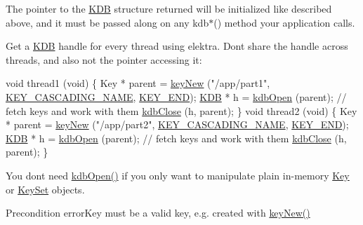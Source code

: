 The pointer to the {\ttfamily \hyperlink{classkdb_1_1KDB}{K\+DB}} structure returned will be initialized like described above, and it must be passed along on any kdb$\ast$() method your application calls.

Get a {\ttfamily \hyperlink{classkdb_1_1KDB}{K\+DB}} handle for every thread using elektra. Don\textquotesingle{}t share the handle across threads, and also not the pointer accessing it\+:


\begin{DoxyCodeInclude}
\textcolor{keywordtype}{void} thread1 (\textcolor{keywordtype}{void})
\{
        Key * parent = \hyperlink{group__key_gad23c65b44bf48d773759e1f9a4d43b89}{keyNew} (\textcolor{stringliteral}{"/app/part1"}, \hyperlink{group__key_gga91fb3178848bd682000958089abbaf40afc1567f74444ff9c219f7456b652b4ec}{KEY\_CASCADING\_NAME}, 
      \hyperlink{group__key_gga91fb3178848bd682000958089abbaf40aa8adb6fcb92dec58fb19410eacfdd403}{KEY\_END});
        \hyperlink{classkdb_1_1KDB_a7e0637995ce9f294cdbc6f167df6db40}{KDB} * h = \hyperlink{group__kdb_ga6808defe5870f328dd17910aacbdc6ca}{kdbOpen} (parent);
        \textcolor{comment}{// fetch keys and work with them}
        \hyperlink{group__kdb_gadb54dc9fda17ee07deb9444df745c96f}{kdbClose} (h, parent);
\}
\textcolor{keywordtype}{void} thread2 (\textcolor{keywordtype}{void})
\{
        Key * parent = \hyperlink{group__key_gad23c65b44bf48d773759e1f9a4d43b89}{keyNew} (\textcolor{stringliteral}{"/app/part2"}, \hyperlink{group__key_gga91fb3178848bd682000958089abbaf40afc1567f74444ff9c219f7456b652b4ec}{KEY\_CASCADING\_NAME}, 
      \hyperlink{group__key_gga91fb3178848bd682000958089abbaf40aa8adb6fcb92dec58fb19410eacfdd403}{KEY\_END});
        \hyperlink{classkdb_1_1KDB_a7e0637995ce9f294cdbc6f167df6db40}{KDB} * h = \hyperlink{group__kdb_ga6808defe5870f328dd17910aacbdc6ca}{kdbOpen} (parent);
        \textcolor{comment}{// fetch keys and work with them}
        \hyperlink{group__kdb_gadb54dc9fda17ee07deb9444df745c96f}{kdbClose} (h, parent);
\}
\end{DoxyCodeInclude}
 You don\textquotesingle{}t need \hyperlink{group__kdb_ga6808defe5870f328dd17910aacbdc6ca}{kdb\+Open()} if you only want to manipulate plain in-\/memory \hyperlink{classkdb_1_1Key}{Key} or \hyperlink{classkdb_1_1KeySet}{Key\+Set} objects.

\begin{DoxyPrecond}{Precondition}
error\+Key must be a valid key, e.\+g. created with \hyperlink{group__key_gad23c65b44bf48d773759e1f9a4d43b89}{key\+New()}
\end{DoxyPrecond}

